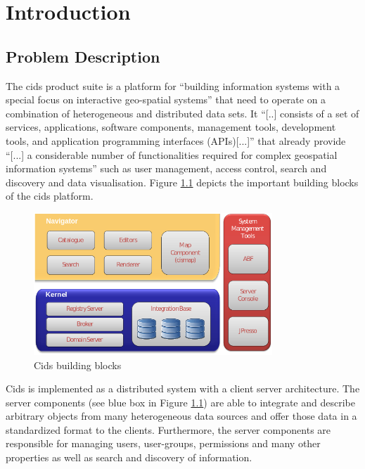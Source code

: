 \chapter{Introduction}\label{chap:intro}

\section{Problem Description} 

The cids product suite is a platform for ``building information systems with a special focus on interactive geo-spatial systems'' \autocite[]{cismet-cids-readMe} that need to operate on a combination of heterogeneous and distributed data sets.
 It ``[..] consists of a set of services, applications, software components, management tools, development tools, and application programming interfaces (APIs)[...]'' \autocite[]{cismet-cids-readMe} that already provide ``[...] a considerable number of functionalities required for complex geospatial information systems'' \autocite[]{cismet-cids-readMe} such as user management, access control, search and discovery and data visualisation.
 Figure \ref{fig:cids_building_blocks} depicts the important building blocks of the cids platform.


\begin{figure}
	\centering \includegraphics[width=0.8\textwidth]{./img/intro/cids_building_blocks.png}
	\caption{Cids building blocks \autocite[]{cismet-cids-readMe}}
	\label{fig:cids_building_blocks}
\end{figure}

Cids is implemented as a distributed system with a client server architecture.
The server components (see blue box in Figure \ref{fig:cids_building_blocks}) are able  to integrate and describe arbitrary objects from many heterogeneous data sources and offer those data in a standardized format to the clients.
Furthermore, the server components are responsible for managing users, user-groups, permissions and many other properties as well as search and discovery of information.

